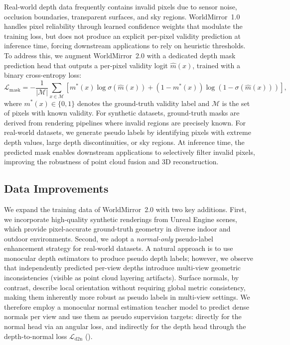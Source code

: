 \documentclass{article} %
\begin{document}
Real-world depth data frequently contains invalid pixels due to sensor noise, occlusion boundaries, transparent surfaces, and sky regions. WorldMirror~1.0 handles pixel reliability through learned confidence weights that modulate the training loss, but does not produce an explicit per-pixel validity prediction at inference time, forcing downstream applications to rely on heuristic thresholds. To address this, we augment WorldMirror~2.0 with a dedicated depth mask prediction head that outputs a per-pixel validity logit $\hat{m}(x)$, trained with a binary cross-entropy loss:
\begin{equation}
    \mathcal{L}_{\text{mask}} = -\frac{1}{|\mathcal{M}|} \sum_{x \in \mathcal{M}} \left[ m^*(x) \log \sigma(\hat{m}(x)) + (1 - m^*(x)) \log (1 - \sigma(\hat{m}(x))) \right],
\end{equation}
where $m^*(x) \in \{0, 1\}$ denotes the ground-truth validity label and $\mathcal{M}$ is the set of pixels with known validity. For synthetic datasets, ground-truth masks are derived from rendering pipelines where invalid regions are precisely known. For real-world datasets, we generate pseudo labels by identifying pixels with extreme depth values, large depth discontinuities, or sky regions. At inference time, the predicted mask enables downstream applications to selectively filter invalid pixels, improving the robustness of point cloud fusion and 3D reconstruction.

\subsection{Data Improvements}
\label{sec:data_improvements}
We expand the training data of WorldMirror~2.0 with two key additions. First, we incorporate high-quality synthetic renderings from Unreal Engine scenes, which provide pixel-accurate ground-truth geometry in diverse indoor and outdoor environments. Second, we adopt a \emph{normal-only} pseudo-label enhancement strategy for real-world datasets.
\label{sec:data_enhancement}
A natural approach is to use monocular depth estimators to produce pseudo depth labels; however, we observe that independently predicted per-view depths introduce multi-view geometric inconsistencies (visible as point cloud layering artifacts). Surface normals, by contrast, describe local orientation without requiring global metric consistency, making them inherently more robust as pseudo labels in multi-view settings. We therefore employ a monocular normal estimation teacher model to predict dense normals per view and use them as pseudo supervision targets: directly for the normal head via an angular loss, and indirectly for the depth head through the depth-to-normal loss $\mathcal{L}_{\text{d2n}}$ ().
\end{document}
